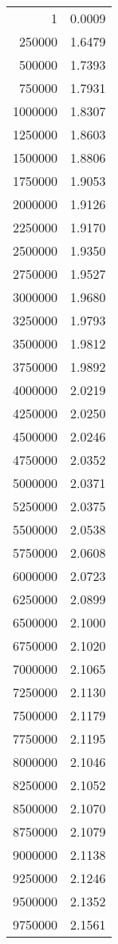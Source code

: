 \begin{table}
	\footnotesize
	\centering
	\begin{tabular}{|r|r|}
		1 & 0.0009 \\ 
		250000 & 1.6479 \\ 
		500000 & 1.7393 \\ 
		750000 & 1.7931 \\ 
		1000000 & 1.8307 \\ 
		1250000 & 1.8603 \\ 
		1500000 & 1.8806 \\ 
		1750000 & 1.9053 \\ 
		2000000 & 1.9126 \\ 
		2250000 & 1.9170 \\ 
		2500000 & 1.9350 \\ 
		2750000 & 1.9527 \\ 
		3000000 & 1.9680 \\ 
		3250000 & 1.9793 \\ 
		3500000 & 1.9812 \\ 
		3750000 & 1.9892 \\ 
		4000000 & 2.0219 \\ 
		4250000 & 2.0250 \\ 
		4500000 & 2.0246 \\ 
		4750000 & 2.0352 \\ 
		5000000 & 2.0371 \\ 
		5250000 & 2.0375 \\ 
		5500000 & 2.0538 \\ 
		5750000 & 2.0608 \\ 
		6000000 & 2.0723 \\ 
		6250000 & 2.0899 \\ 
		6500000 & 2.1000 \\ 
		6750000 & 2.1020 \\ 
		7000000 & 2.1065 \\ 
		7250000 & 2.1130 \\ 
		7500000 & 2.1179 \\ 
		7750000 & 2.1195 \\ 
		8000000 & 2.1046 \\ 
		8250000 & 2.1052 \\ 
		8500000 & 2.1070 \\ 
		8750000 & 2.1079 \\ 
		9000000 & 2.1138 \\ 
		9250000 & 2.1246 \\ 
		9500000 & 2.1352 \\ 
		9750000 & 2.1561 \\ 
	\end{tabular}
\end{table}